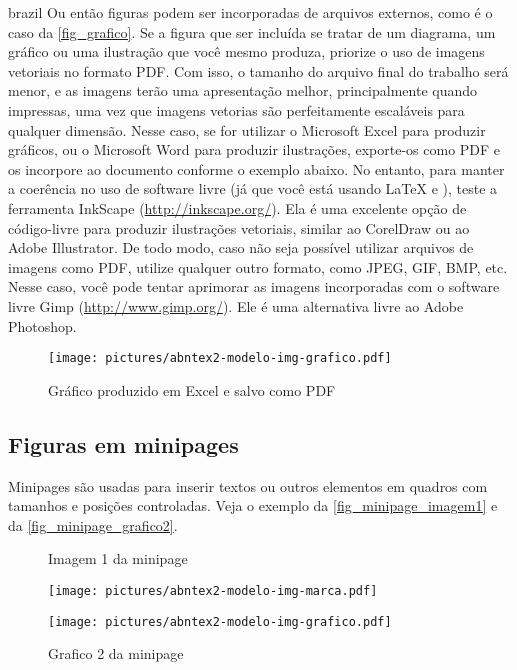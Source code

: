 \begin{otherlanguage*}{brazil}
Ou então figuras podem ser incorporadas de arquivos externos, como é o caso da
\autoref{fig_grafico}. Se a figura que ser incluída se tratar de um diagrama, um
gráfico ou uma ilustração que você mesmo produza, priorize o uso de imagens
vetoriais no formato PDF. Com isso, o tamanho do arquivo final do trabalho será
menor, e as imagens terão uma apresentação melhor, principalmente quando
impressas, uma vez que imagens vetorias são perfeitamente escaláveis para
qualquer dimensão. Nesse caso, se for utilizar o Microsoft Excel para produzir
gráficos, ou o Microsoft Word para produzir ilustrações, exporte-os como PDF e
os incorpore ao documento conforme o exemplo abaixo. No entanto, para manter a
coerência no uso de software livre (já que você está usando \LaTeX{} e \abnTeX{}),
teste a ferramenta \textsf{InkScape}
(\url{http://inkscape.org/}). Ela é uma excelente opção de código-livre para
produzir ilustrações vetoriais, similar ao CorelDraw ou ao Adobe
Illustrator. De todo modo, caso não seja possível
utilizar arquivos de imagens como PDF, utilize qualquer outro formato, como
JPEG, GIF, BMP, etc. Nesse caso, você pode tentar aprimorar as imagens
incorporadas com o software livre \textsf{Gimp}
(\url{http://www.gimp.org/}). Ele é uma alternativa livre ao Adobe
Photoshop.

\begin{figure}[htb]
    \caption{\label{fig_grafico}Gráfico produzido em Excel e salvo como PDF}
    \begin{center}
        \texttt{[image: pictures/abntex2-modelo-img-grafico.pdf]}
    \end{center}
\end{figure}

\subsection{Figuras em minipages}

Minipages são usadas para inserir textos ou outros elementos em quadros
com tamanhos e posições controladas. Veja o exemplo da
\autoref{fig_minipage_imagem1} e da \autoref{fig_minipage_grafico2}.

\begin{figure}[htb]
\label{teste}
\centering
 \begin{minipage}{0.49\textwidth}
   \centering
   \caption{Imagem 1 da minipage} \label{fig_minipage_imagem1}
   \texttt{[image: pictures/abntex2-modelo-img-marca.pdf]}
 \end{minipage}
 \hfill
 \begin{minipage}{0.49\textwidth}
   \centering
   \caption{Grafico 2 da minipage} \label{fig_minipage_grafico2}
   \texttt{[image: pictures/abntex2-modelo-img-grafico.pdf]}
 \end{minipage}
\end{figure}




\end{otherlanguage*}
